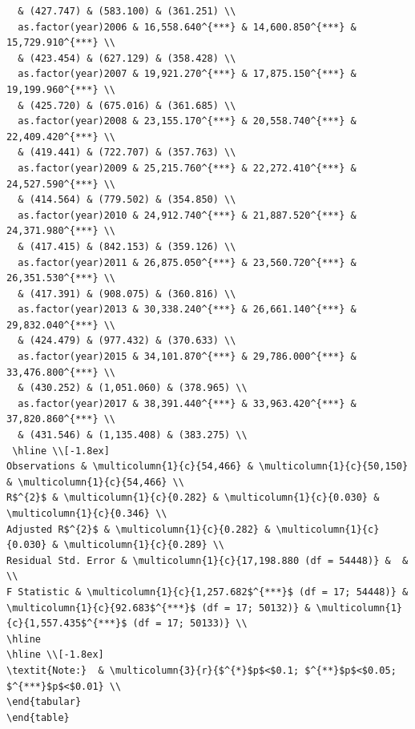 \documentclass[
]{article}
\begin{document}
\begin{verbatim}
  & (427.747) & (583.100) & (361.251) \\ 
  as.factor(year)2006 & 16,558.640^{***} & 14,600.850^{***} & 15,729.910^{***} \\ 
  & (423.454) & (627.129) & (358.428) \\ 
  as.factor(year)2007 & 19,921.270^{***} & 17,875.150^{***} & 19,199.960^{***} \\ 
  & (425.720) & (675.016) & (361.685) \\ 
  as.factor(year)2008 & 23,155.170^{***} & 20,558.740^{***} & 22,409.420^{***} \\ 
  & (419.441) & (722.707) & (357.763) \\ 
  as.factor(year)2009 & 25,215.760^{***} & 22,272.410^{***} & 24,527.590^{***} \\ 
  & (414.564) & (779.502) & (354.850) \\ 
  as.factor(year)2010 & 24,912.740^{***} & 21,887.520^{***} & 24,371.980^{***} \\ 
  & (417.415) & (842.153) & (359.126) \\ 
  as.factor(year)2011 & 26,875.050^{***} & 23,560.720^{***} & 26,351.530^{***} \\ 
  & (417.391) & (908.075) & (360.816) \\ 
  as.factor(year)2013 & 30,338.240^{***} & 26,661.140^{***} & 29,832.040^{***} \\ 
  & (424.479) & (977.432) & (370.633) \\ 
  as.factor(year)2015 & 34,101.870^{***} & 29,786.000^{***} & 33,476.800^{***} \\ 
  & (430.252) & (1,051.060) & (378.965) \\ 
  as.factor(year)2017 & 38,391.440^{***} & 33,963.420^{***} & 37,820.860^{***} \\ 
  & (431.546) & (1,135.408) & (383.275) \\ 
 \hline \\[-1.8ex] 
Observations & \multicolumn{1}{c}{54,466} & \multicolumn{1}{c}{50,150} & \multicolumn{1}{c}{54,466} \\ 
R$^{2}$ & \multicolumn{1}{c}{0.282} & \multicolumn{1}{c}{0.030} & \multicolumn{1}{c}{0.346} \\ 
Adjusted R$^{2}$ & \multicolumn{1}{c}{0.282} & \multicolumn{1}{c}{0.030} & \multicolumn{1}{c}{0.289} \\ 
Residual Std. Error & \multicolumn{1}{c}{17,198.880 (df = 54448)} &  &  \\ 
F Statistic & \multicolumn{1}{c}{1,257.682$^{***}$ (df = 17; 54448)} & \multicolumn{1}{c}{92.683$^{***}$ (df = 17; 50132)} & \multicolumn{1}{c}{1,557.435$^{***}$ (df = 17; 50133)} \\ 
\hline 
\hline \\[-1.8ex] 
\textit{Note:}  & \multicolumn{3}{r}{$^{*}$p$<$0.1; $^{**}$p$<$0.05; $^{***}$p$<$0.01} \\ 
\end{tabular} 
\end{table} 
\end{verbatim}
\end{document}
